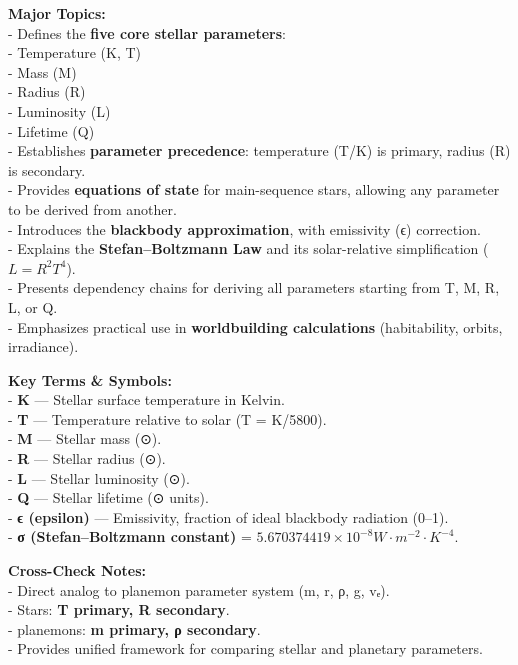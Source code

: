 \documentclass[
  letterpaper,
]{book}
\begin{document}
\textbf{Major Topics:}\\
- Defines the \textbf{five core stellar parameters}:\\
- Temperature (K, T)\\
- Mass (M)\\
- Radius (R)\\
- Luminosity (L)\\
- Lifetime (Q)\\
- Establishes \textbf{parameter precedence}: temperature (T/K) is
primary, radius (R) is secondary.\\
- Provides \textbf{equations of state} for main-sequence stars, allowing
any parameter to be derived from another.\\
- Introduces the \textbf{blackbody approximation}, with emissivity (ϵ)
correction.\\
- Explains the \textbf{Stefan--Boltzmann Law} and its solar-relative
simplification (\(L = R^2T^4\)).\\
- Presents dependency chains for deriving all parameters starting from
T, M, R, L, or Q.\\
- Emphasizes practical use in \textbf{worldbuilding calculations}
(habitability, orbits, irradiance).

\textbf{Key Terms \& Symbols:}\\
- \textbf{K} --- Stellar surface temperature in Kelvin.\\
- \textbf{T} --- Temperature relative to solar (T = K/5800).\\
- \textbf{M} --- Stellar mass (⊙).\\
- \textbf{R} --- Stellar radius (⊙).\\
- \textbf{L} --- Stellar luminosity (⊙).\\
- \textbf{Q} --- Stellar lifetime (⊙ units).\\
- \textbf{ϵ (epsilon)} --- Emissivity, fraction of ideal blackbody
radiation (0--1).\\
- \textbf{σ (Stefan--Boltzmann constant)} =
\(5.670374419 × 10^{-8} W·m^{-2}·K^{-4}\).

\textbf{Cross-Check Notes:}\\
- Direct analog to planemon parameter system (m, r, ρ, g, vₑ).\\
- Stars: \textbf{T primary, R secondary}.\\
- planemons: \textbf{m primary, ρ secondary}.\\
- Provides unified framework for comparing stellar and planetary
parameters.
\end{document}
